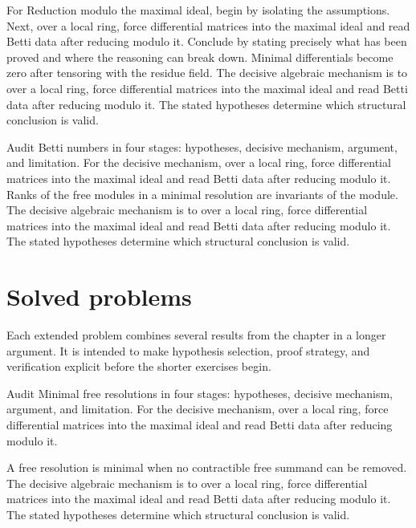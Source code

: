 \begin{example}\label{ex:v25-worked-03}
For Reduction modulo the maximal ideal, begin by isolating the assumptions. Next, over a local ring, force differential matrices into the maximal ideal and read Betti data after reducing modulo it. Conclude by stating precisely what has been proved and where the reasoning can break down. Minimal differentials become zero after tensoring with the residue field. The decisive algebraic mechanism is to over a local ring, force differential matrices into the maximal ideal and read Betti data after reducing modulo it. The stated hypotheses determine which structural conclusion is valid.
\end{example}

\begin{example}\label{ex:v25-worked-04}
Audit Betti numbers in four stages: hypotheses, decisive mechanism, argument, and limitation. For the decisive mechanism, over a local ring, force differential matrices into the maximal ideal and read Betti data after reducing modulo it. Ranks of the free modules in a minimal resolution are invariants of the module. The decisive algebraic mechanism is to over a local ring, force differential matrices into the maximal ideal and read Betti data after reducing modulo it. The stated hypotheses determine which structural conclusion is valid.
\end{example}

\section{Solved problems}
Each extended problem combines several results from the chapter in a longer argument. It is intended to make hypothesis selection, proof strategy, and verification explicit before the shorter exercises begin.

\begin{problem}\label{prob:v25-problem-01}
Audit Minimal free resolutions in four stages: hypotheses, decisive mechanism, argument, and limitation. For the decisive mechanism, over a local ring, force differential matrices into the maximal ideal and read Betti data after reducing modulo it.
\end{problem}
\begin{solution}
A free resolution is minimal when no contractible free summand can be removed. The decisive algebraic mechanism is to over a local ring, force differential matrices into the maximal ideal and read Betti data after reducing modulo it. The stated hypotheses determine which structural conclusion is valid.
\end{solution}

